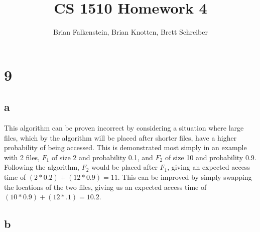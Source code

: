 \documentclass[letterpaper,notitlepage,twoside]{article}
\title{CS 1510 Homework 4}
\author{Brian Falkenstein, Brian Knotten, Brett Schreiber}
\begin{document}
\maketitle

\section*{9}
\subsection*{a}
This algorithm can be proven incorrect by considering a situation where large files, which by the algorithm will be placed after shorter files, have a higher probability of being accessed. This is demonstrated most simply in an example with 2 files, $F_1$ of size 2 and probability 0.1, and $F_2$ of size 10 and probability 0.9. Following the algorithm, $F_2$ would be placed after $F_1$, giving an expected access time of $(2*0.2)+(12*0.9)=11$. This can be improved by simply swapping the locations of the two files, giving us an expected access time of $(10*0.9)+(12*.1)=10.2$.
\subsection*{b}
\end{document}
